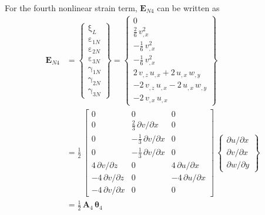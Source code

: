 For the fourth nonlinear strain term, $\mathbf{E}_{N4}$ can be written as
\begin{equation}
	\begin{aligned}
		\mathbf{E}_{N4} & =  \begin{Bmatrix}
			\mathrm \xi_{L} \\
			\mathrm \varepsilon_{1N} \\                    
			\mathrm \varepsilon_{2N} \\           
			\mathrm \varepsilon_{3N} \\           
			\mathrm \gamma_{1N} \\                
			\mathrm \gamma_{2N} \\                
			\mathrm \gamma_{3N} \end{Bmatrix} =   
		\begin{Bmatrix}                       
			0\\
			\tfrac{2}{6} \, v_{,x}^2   \\
			- \tfrac{1}{6} \, v_{,x}^2  \\
			- \tfrac{1}{6} \, v_{,x}^2  \\ 
			2 \, v_{,z} \, u_{,x} + 2 \, u_{,x} \, w_{,y}   \\
			- 2 \, v_{,z} \, u_{,x} - 2 \, u_{,x} \, w_{,y} \\ 
			- 2 \, v_{,x} \, u_{,x}  \end{Bmatrix} \\
		& = \frac{1}{2} \, \begin{bmatrix}
			0 & 0 &  0   \\
			0 &  \tfrac{2}{3} \, \partial v / \partial x & 0  \\
			0 &  - \tfrac{1}{3} \, \partial v / \partial x & 0 \\
			0 &  - \tfrac{1}{3} \, \partial v / \partial x & 0 \\
			4 \, \partial v / \partial z &  0 & 4 \, \partial u / \partial x  \\
			-4 \,\partial v / \partial z &  0 & -4 \,\partial u / \partial x  \\
			-4 \,\partial v / \partial x &  0 & 0  \end{bmatrix} \, \begin{Bmatrix}
			\partial u / \partial x\\
			\partial v / \partial x \\
			\partial w / \partial y
		\end{Bmatrix} \\
	    &	= \tfrac{1}{2} \, \mathbf{A}_4 \, \boldsymbol{\theta}_4
	\end{aligned}
\end{equation}
